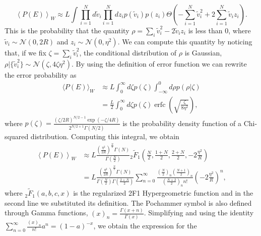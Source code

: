 \documentclass[a4paper]{article}%
\DeclareMathOperator\erfc{erfc}
\begin{document}
\begin{equation}
\left\langle P(E)\right\rangle _{W} \approx L \int\prod_{i=1}^{N} d \tilde
{v}_{i} \prod_{i=1}^{N} dz_{i} p(\tilde{v}_{i}) p(z_{i}) \Theta\left(
-\sum_{i=1}^{N} \tilde{v}^{2}_{i} +2\sum_{i=1}^{N} \tilde{v}_{i} z_{i}\right)
.
\end{equation}
This is the probability that the quantity $\rho= \sum_{i} \tilde{v}_{i}^{2} -
2\tilde{v}_{i} z_{i}$ is less than 0, where $\tilde{v}_{i} \sim\mathcal{N}%
(0,2R)$ and $z_{i} \sim\mathcal{N}(0,\eta^{2})$. We can compute this quantity
by noticing that, if we fix $\zeta= \sum_{i} \tilde{v}^{2}_{i}$, the
conditional distribution of $\rho$ is Gaussian, $\rho|\{\tilde{v}_{i}^{2}\}
\sim\mathcal{N}(\zeta,4\zeta\eta^{2}) $. By using the definition of error
function we can rewrite the error probability as
\begin{equation}%
\begin{split}
\langle P(E)\rangle_{W}  &  \approx L\int_{0}^{\infty}d\zeta p(\zeta)
\int_{-\infty}^{0} d\rho p(\rho|\zeta)\\
&  = \frac{L}{2}\int_{0}^{\infty}d\zeta p(\zeta)
\erfc{\left(\sqrt{\frac{\zeta}{8\eta^2}}\right)},
\end{split}
\end{equation}
where $p(\zeta) = \frac{(\zeta/2R)^{N/2 -1}\exp\left(  - \zeta/4R\right)
}{2^{N/2 +1} \Gamma(N/2)}$ is the probability density function of a
Chi-squared distribution. Computing this integral, we obtain
\begin{equation}%
\begin{split}
\left\langle P(E)\right\rangle _{W}  &  \approx L \frac{(\frac{\eta^{2}}
{2R})^{\frac{N}{2}}\Gamma(N)}{\Gamma(\frac{N}{2})} {}_{2}\tilde{F}_{1}\left(
\frac{N}{2},\frac{1+N}{2},\frac{2+N}{2},-2\frac{\eta^{2}}{R} \right) \\
&  =L \frac{\left(  \frac{\eta^{2}}{2R}\right)  ^{\frac{N}{2}}\Gamma\left(
N\right)  }{\Gamma\left(  \frac{N} {2}\right)  \Gamma\left(  \frac{2+N}%
{2}\right)  }\sum_{n=0}^{\infty}\frac{\left(  \frac{N}{2}\right)  _{n} \left(
\frac{N+1}{2}\right)  _{n}}{\left(  \frac{N+2}{2}\right)  _{n} n!} \left(
-2\frac{\eta^{2}}{R}\right)  ^{n},
\end{split}
\end{equation}
where ${}_{2}\tilde{F}_{1}(a,b,c,x)$ is the regularized 2F1 Hypergeometric
function and in the second line we substituted its definition. The Pochammer
symbol is also defined through Gamma functions, $(x)_{n} = \frac{\Gamma
(x+n)}{\Gamma(x)}$. Simplifying and using the identity $\sum_{n=0}^{\infty
}\frac{(x)_{n}}{n!} a^{n} = (1-a)^{-x}$, we obtain the expression for the
\end{document}
